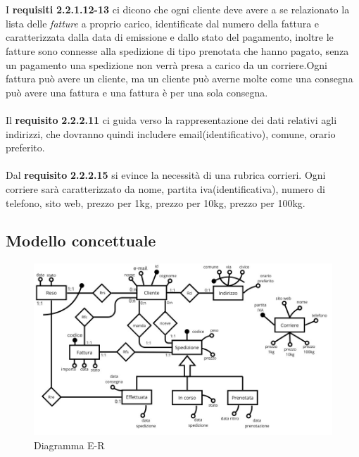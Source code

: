 \\\\
I \textbf{requisiti} \textbf{2.2.1.12-13} ci dicono che ogni cliente deve avere a se relazionato la lista delle \textit{fatture} a proprio carico, identificate dal numero della fattura e caratterizzata dalla data di emissione e dallo stato del pagamento, inoltre le fatture sono connesse alla spedizione di tipo prenotata che hanno pagato, senza un pagamento una spedizione non verrà presa a carico da un corriere.Ogni fattura può avere un cliente, ma un cliente può averne molte come una consegna può avere una fattura e una fattura è per una sola consegna.
\\\\
Il \textbf{requisito} \textbf{2.2.2.11} ci guida verso la rappresentazione dei dati relativi agli indirizzi, che dovranno quindi includere 
email(identificativo), comune, orario preferito. \\ \\
Dal \textbf{requisito} \textbf{2.2.2.15} si evince la necessità di una rubrica corrieri. Ogni corriere sarà caratterizzato da nome, 
partita iva(identificativa), numero di telefono, sito web, prezzo per 1kg, prezzo per 10kg, prezzo per 100kg.

\subsection{Modello concettuale}
\begin{figure}[H]
  \centering
  \includegraphics[width=\textwidth]{assets/ER_diagram.jpg}
  \caption{Diagramma E-R}
\end{figure}
